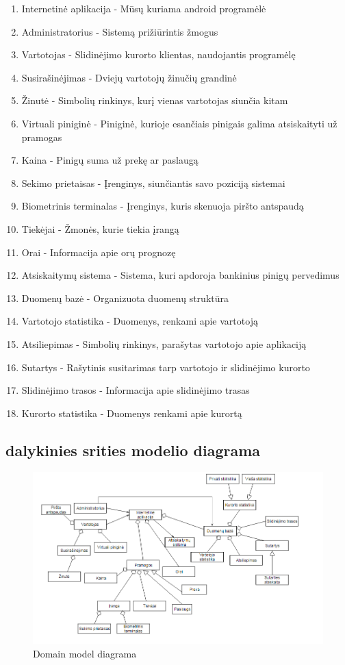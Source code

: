 \documentclass[oneside]{VUMIFPSkursinis}
\begin{document}
\begin{enumerate}
	\item Internetinė aplikacija - Mūsų kuriama android programėlė
	\item Administratorius - Sistemą prižiūrintis žmogus
	\item Vartotojas - Slidinėjimo kurorto klientas, naudojantis programėlę
	\item Susirašinėjimas - Dviejų vartotojų žinučių grandinė
	\item Žinutė - Simbolių rinkinys, kurį vienas vartotojas siunčia kitam
	\item Virtuali piniginė - Piniginė, kurioje esančiais pinigais galima atsiskaityti už pramogas
	\item Kaina - Pinigų suma už prekę ar paslaugą
	\item Sekimo prietaisas - Įrenginys, siunčiantis savo poziciją sistemai
	\item Biometrinis terminalas - Įrenginys, kuris skenuoja piršto antspaudą
	\item Tiekėjai - Žmonės, kurie tiekia įrangą
	\item Orai - Informacija apie orų prognozę
	\item Atsiskaitymų sistema - Sistema, kuri apdoroja bankinius pinigų pervedimus
	\item Duomenų bazė - Organizuota duomenų struktūra
	\item Vartotojo statistika - Duomenys, renkami apie vartotoją
	\item Atsiliepimas - Simbolių rinkinys, parašytas vartotojo apie aplikaciją
	\item Sutartys - Rašytinis susitarimas tarp vartotojo ir slidinėjimo kurorto
	\item Slidinėjimo trasos - Informacija apie slidinėjimo trasas
	\item Kurorto statistika - Duomenys renkami apie kurortą
\end{enumerate}
\pagebreak

\subsection{dalykinies srities modelio diagrama}
\begin{figure}[h]
    \centering
    \includegraphics[width=1\textwidth]{DomainModel.png}
    \caption{Domain model diagrama}
    \label{fig:DomainModel}
\end{figure}
\pagebreak
\end{document}
